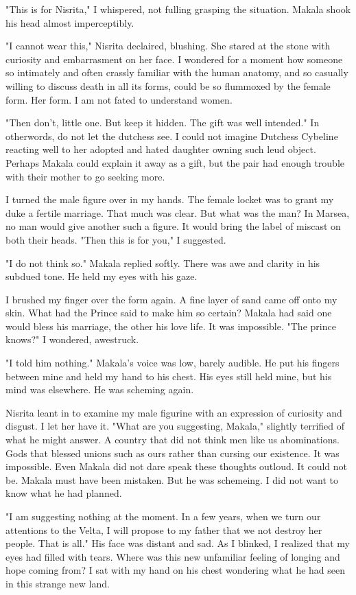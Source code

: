 \documentclass{article}
\begin{document}
"This is for Nisrita," I whispered, not fulling grasping the situation. Makala shook his head almost imperceptibly.

"I cannot wear this," Nisrita declaired, blushing. She stared at the stone with curiosity and embarrasment on her face. I wondered for a moment how someone so intimately and often crassly familiar with the human anatomy, and so casually willing to discuss death in all its forms, could be so flummoxed by the female form. Her form. I am not fated to understand women.

"Then don't, little one. But keep it hidden. The gift was well intended."  In otherwords, do not let the dutchess see. I could not imagine Dutchess Cybeline reacting well to her adopted and hated daughter owning such leud object. Perhaps Makala could explain it away as a gift, but the pair had enough trouble with their mother to go seeking more.
 
I turned the male figure over in my hands. The female locket was to grant my duke a fertile marriage. That much was clear. But what was the man?  In Marsea, no man would give another such a figure. It would bring the label of miscast on both their heads. "Then this is for you," I suggested.

"I do not think so." Makala replied softly. There was awe and clarity in his subdued tone. He held my eyes with his gaze. 

I brushed my finger over the form again. A fine layer of sand came off onto my skin. What had the Prince said to make him so certain? Makala had said one would bless his marriage, the other his love life. It was impossible. "The prince knows?" I wondered, awestruck. 

"I told him nothing." Makala's voice was low, barely audible. He put his fingers between mine and held my hand to his chest. His eyes still held mine, but his mind was elsewhere. He was scheming again. 

Nisrita leant in to examine my male figurine with an expression of curiosity and disgust. I let her have it. "What are you suggesting, Makala," slightly terrified of what he might answer. A country that did not think men like us abominations. Gods that blessed unions such as ours rather than cursing our existence. It was impossible. Even Makala did not dare speak these thoughts outloud. It could not be. Makala must have been mistaken. But he was schemeing. I did not want to know what he had planned.

"I am suggesting nothing at the moment. In a few years, when we turn our attentions to the Velta, I will propose to my father that we not destroy her people. That is all." His face was distant and sad. As I blinked, I realized that my eyes had filled with tears. Where was this new unfamiliar feeling of longing and hope coming from? I sat with my hand on his chest wondering what he had seen in this strange new land.
\end{document}
